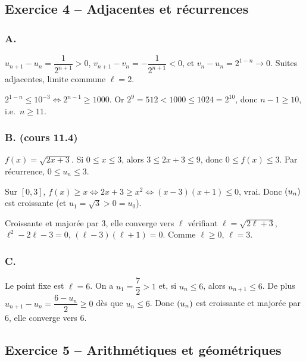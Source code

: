\documentclass[11pt,a4paper]{article}
\begin{document}
\subsection{Exercice 4 -- Adjacentes et récurrences}

\subsubsection*{A.}
$u_{n+1}-u_n = \dfrac{1}{2^{n+1}}>0$, $v_{n+1}-v_n = -\dfrac{1}{2^{n+1}}<0$, et $v_n-u_n = 2^{1-n}\to 0$. Suites adjacentes, limite commune $\ell=2$.

$2^{1-n}\leq 10^{-3}\iff 2^{n-1}\geq 1000$. Or $2^{9}=512<1000\leq 1024=2^{10}$, donc $n-1\geq 10$, i.e.\ $n\geq 11$.

\subsubsection*{B. (cours 11.4)}
$f(x)=\sqrt{2x+3}$. Si $0\leq x\leq 3$, alors $3\leq 2x+3\leq 9$, donc $0\leq f(x)\leq 3$. Par récurrence, $0\leq u_n\leq 3$.

Sur $[0,3]$, $f(x)\geq x \iff 2x+3\geq x^2 \iff (x-3)(x+1)\leq 0$, vrai. Donc $(u_n)$ est croissante (et $u_1=\sqrt{3}>0=u_0$).

Croissante et majorée par $3$, elle converge vers $\ell$ vérifiant $\ell=\sqrt{2\ell+3}$, $\ell^2-2\ell-3=0$, $(\ell-3)(\ell+1)=0$. Comme $\ell\geq 0$, $\ell=3$.

\subsubsection*{C.}
Le point fixe est $\ell=6$. On a $u_1=\dfrac72>1$ et, si $u_n\leq 6$, alors $u_{n+1}\leq 6$. De plus $u_{n+1}-u_n = \dfrac{6-u_n}{2}\geq 0$ dès que $u_n\leq 6$. Donc $(u_n)$ est croissante et majorée par $6$, elle converge vers $6$.

\subsection{Exercice 5 -- Arithmétiques et géométriques}
\end{document}
